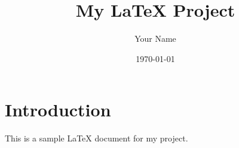 \documentclass{article}
\begin{document}
\title{My LaTeX Project}
\author{Your Name}
\date{\today}
\maketitle

\section{Introduction}
This is a sample LaTeX document for my project.
\end{document}
